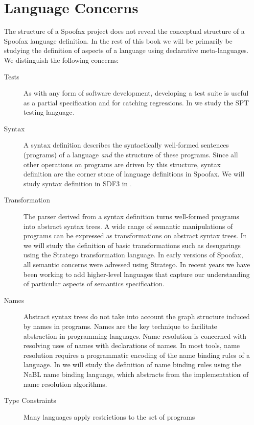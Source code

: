 \section{Language Concerns}

The structure of a Spoofax project does not reveal the conceptual structure of a
Spoofax language definition. In the rest of this book we will be primarily be
studying the definition of aspects of a language using declarative
meta-languages. We distinguish the following concerns:

\begin{description}
\item[Tests] As with any form of software development, developing
a test suite is useful as a partial specification and for catching regressions.
In  we study the SPT testing language.
\item[Syntax] A syntax definition describes the syntactically well-formed
sentences (programs) of a language \emph{and} the structure of these programs.
Since all other operations on programs are driven by this structure, syntax
definition are the corner stone of language definitions in Spoofax. We will
study syntax definition in SDF3 in .
\item[Transformation] The parser derived from a syntax definition turns
well-formed programs into abstract syntax trees. A wide range of semantic
manipulations of programs can be expressed as transformations on abstract syntax
trees. In  we will study the definition of basic
transformations such as desugarings using the Stratego transformation language.
In early versions of Spoofax, all semantic concerns were adressed using
Stratego. In recent years we have been working to add higher-level languages
that capture our understanding of particular aspects of semantics specification.
\item[Names] Abstract syntax trees do not take into account the graph structure
induced by names in programs. Names are the key technique to facilitate
abstraction in programming languages. Name resolution is concerned with
resolving uses of names with declarations of names. In most tools, name
resolution requires a programmatic encoding of the name binding rules of a
language. In  we will study the definition of name binding rules
using the NaBL name binding language, which abstracts from the implementation of
name resolution algorithms.
\item[Type Constraints] Many languages apply restrictions to the set of programs

\end{description}
